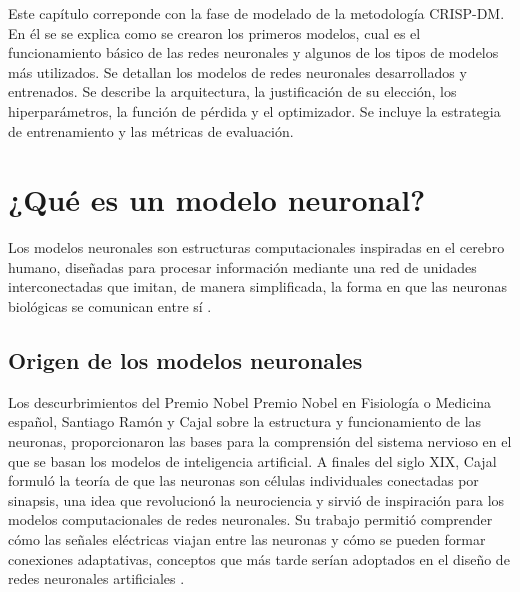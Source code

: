 
Este capítulo correponde con la fase de modelado de la metodología CRISP-DM. En él se se explica como se crearon los primeros modelos, cual es el funcionamiento básico de las redes neuronales y algunos de los tipos de modelos más utilizados. Se detallan los modelos de redes neuronales desarrollados y entrenados. Se describe la arquitectura, la justificación de su elección, los hiperparámetros, la función de pérdida y el optimizador. Se incluye la estrategia de entrenamiento y las métricas de evaluación.

\section{¿Qué es un modelo neuronal?}


Los modelos neuronales son estructuras computacionales inspiradas en el cerebro humano, diseñadas para procesar información mediante una red de unidades interconectadas que imitan, de manera simplificada, la forma en que las neuronas biológicas se comunican entre sí \cite{goodfellow2016deep}.

\subsection{Origen de los modelos neuronales}
Los descurbrimientos del Premio Nobel Premio Nobel en Fisiología o Medicina español, Santiago Ramón y Cajal sobre la estructura y funcionamiento de las neuronas, proporcionaron las bases para la comprensión del sistema nervioso en el que se basan los modelos de inteligencia artificial. A finales del siglo XIX, Cajal formuló la teoría de que las neuronas son células individuales conectadas por sinapsis, una idea que revolucionó la neurociencia y sirvió de inspiración para los modelos computacionales de redes neuronales. Su trabajo permitió comprender cómo las señales eléctricas viajan entre las neuronas y cómo se pueden formar conexiones adaptativas, conceptos que más tarde serían adoptados en el diseño de redes neuronales artificiales \cite{leCun2015}.


